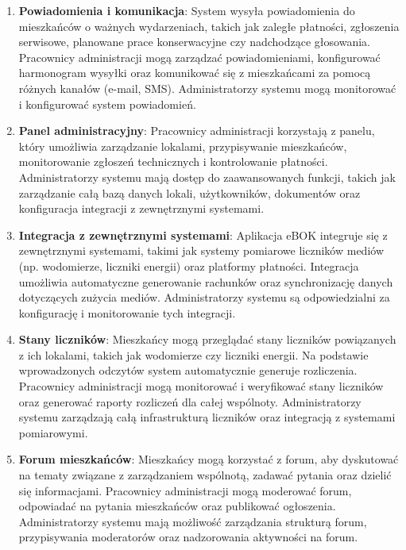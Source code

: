 \begin{enumerate}[label=\arabic*.]
	\item \textbf{Powiadomienia i komunikacja}: System wysyła powiadomienia do mieszkańców o ważnych wydarzeniach, takich jak zaległe płatności, zgłoszenia serwisowe, planowane prace konserwacyjne czy nadchodzące głosowania. Pracownicy administracji mogą zarządzać powiadomieniami, konfigurować harmonogram wysyłki oraz komunikować się z mieszkańcami za pomocą różnych kanałów (e-mail, SMS). Administratorzy systemu mogą monitorować i konfigurować system powiadomień.
	
	\item \textbf{Panel administracyjny}: Pracownicy administracji korzystają z panelu, który umożliwia zarządzanie lokalami, przypisywanie mieszkańców, monitorowanie zgłoszeń technicznych i kontrolowanie płatności. Administratorzy systemu mają dostęp do zaawansowanych funkcji, takich jak zarządzanie całą bazą danych lokali, użytkowników, dokumentów oraz konfiguracja integracji z zewnętrznymi systemami.
	
	\item \textbf{Integracja z zewnętrznymi systemami}: Aplikacja eBOK integruje się z zewnętrznymi systemami, takimi jak systemy pomiarowe liczników mediów (np. wodomierze, liczniki energii) oraz platformy płatności. Integracja umożliwia automatyczne generowanie rachunków oraz synchronizację danych dotyczących zużycia mediów. Administratorzy systemu są odpowiedzialni za konfigurację i monitorowanie tych integracji.
	
	\item \textbf{Stany liczników}: Mieszkańcy mogą przeglądać stany liczników powiązanych z ich lokalami, takich jak wodomierze czy liczniki energii. Na podstawie wprowadzonych odczytów system automatycznie generuje rozliczenia. Pracownicy administracji mogą monitorować i weryfikować stany liczników oraz generować raporty rozliczeń dla całej wspólnoty. Administratorzy systemu zarządzają całą infrastrukturą liczników oraz integracją z systemami pomiarowymi.
	
	\item \textbf{Forum mieszkańców}: Mieszkańcy mogą korzystać z forum, aby dyskutować na tematy związane z zarządzaniem wspólnotą, zadawać pytania oraz dzielić się informacjami. Pracownicy administracji mogą moderować forum, odpowiadać na pytania mieszkańców oraz publikować ogłoszenia. Administratorzy systemu mają możliwość zarządzania strukturą forum, przypisywania moderatorów oraz nadzorowania aktywności na forum.
	
\end{enumerate}

